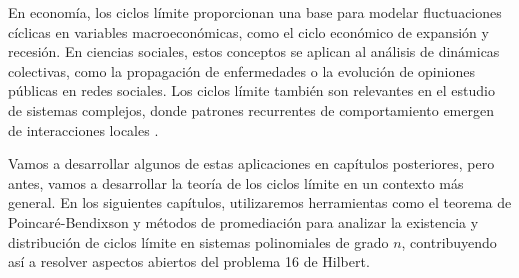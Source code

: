 \begin{enumerate}
	En economía, los ciclos límite proporcionan una base para modelar fluctuaciones cíclicas en variables macroeconómicas, como el ciclo económico de expansión y recesión. En ciencias sociales, estos conceptos se aplican al análisis de dinámicas colectivas, como la propagación de enfermedades o la evolución de opiniones públicas en redes sociales. Los ciclos límite también son relevantes en el estudio de sistemas complejos, donde patrones recurrentes de comportamiento emergen de interacciones locales \cite{wiggins2003introduction}.
\end{enumerate}

Vamos a desarrollar algunos de estas aplicaciones en capítulos posteriores, pero antes, vamos a desarrollar la teoría de los ciclos límite en un contexto más general.
En los siguientes capítulos, utilizaremos herramientas como el teorema de Poincaré-Bendixson y métodos de promediación para analizar la existencia y distribución de ciclos límite en sistemas polinomiales de grado $n$, contribuyendo así a resolver aspectos abiertos del problema 16 de Hilbert.
